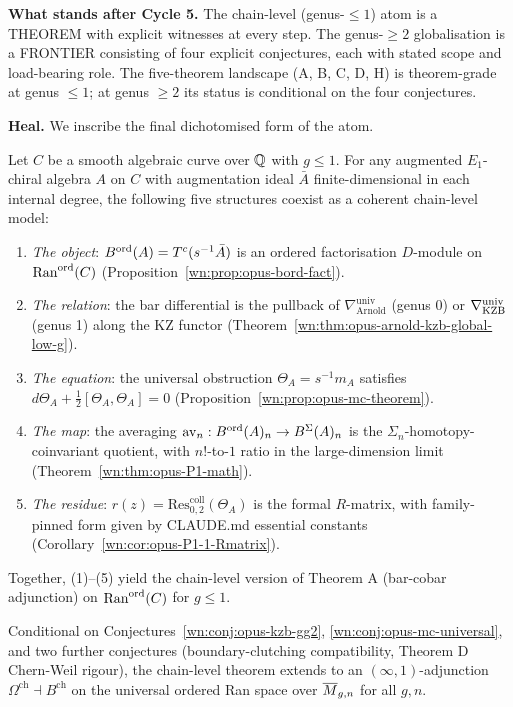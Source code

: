 \textbf{What stands after Cycle 5.} The chain-level (genus-$\le 1$)
atom is a THEOREM with explicit witnesses at every step. The genus-$\ge 2$
globalisation is a FRONTIER consisting of four explicit conjectures, each
with stated scope and load-bearing role. The five-theorem landscape
(A, B, C, D, H) is theorem-grade at genus $\le 1$; at genus $\ge 2$
its status is conditional on the four conjectures.

\textbf{Heal.} We inscribe the final dichotomised form of the atom.

\begin{theorem}
\label{wn:thm:opus-atom-chain}\ClaimStatusTheorem
Let $C$ be a smooth algebraic curve over $\mathbb{Q}$ with $g \le 1$. For any
augmented $E_1$-chiral algebra $A$ on $C$ with augmentation ideal
$\bar A$ finite-dimensional in each internal degree, the following
five structures coexist as a coherent chain-level model:
\begin{enumerate}
\item \emph{The object}: $B^{\mathrm{ord}}(A) = T^c(s^{-1} \bar A)$ is an ordered
factorisation $D$-module on $\mathrm{Ran}^{\mathrm{ord}}(C)$
(Proposition~\ref{wn:prop:opus-bord-fact}).
\item \emph{The relation}: the bar differential is the pullback of
$\nabla_{\mathrm{Arnold}}^{\mathrm{univ}}$ (genus 0) or
$\nabla_{\mathrm{KZB}}^{\mathrm{univ}}$ (genus 1) along the KZ
functor (Theorem~\ref{wn:thm:opus-arnold-kzb-global-low-g}).
\item \emph{The equation}: the universal obstruction $\Theta_A =
s^{-1} m_A$ satisfies $d \Theta_A + \tfrac{1}{2} [\Theta_A, \Theta_A] =
0$ (Proposition~\ref{wn:prop:opus-mc-theorem}).
\item \emph{The map}: the averaging $\mathrm{av}_n: B^{\mathrm{ord}}(A)_n \to B^{\Sigma}(A)_n$
is the $\Sigma_n$-homotopy-coinvariant quotient, with $n!$-to-$1$ ratio
in the large-dimension limit (Theorem~\ref{wn:thm:opus-P1-math}).
\item \emph{The residue}: $r(z) = \mathrm{Res}^{\mathrm{coll}}_{0,2}
(\Theta_A)$ is the formal $R$-matrix, with family-pinned form given by
CLAUDE.md essential constants (Corollary~\ref{wn:cor:opus-P1-1-Rmatrix}).
\end{enumerate}
Together, (1)--(5) yield the chain-level version of Theorem A
(bar-cobar adjunction) on $\mathrm{Ran}^{\mathrm{ord}}(C)$ for $g \le 1$.
\end{theorem}

\begin{corollary}
\label{wn:cor:opus-atom-inf1}\ClaimStatusConjectured
Conditional on Conjectures~\ref{wn:conj:opus-kzb-gg2},
\ref{wn:conj:opus-mc-universal}, and two further conjectures
(boundary-clutching compatibility, Theorem D Chern-Weil rigour), the
chain-level theorem extends to an $(\infty,1)$-adjunction
$\Omega^{\mathrm{ch}} \dashv B^{\mathrm{ch}}$ on the universal ordered
Ran space over $\overline{M}_{g,n}$ for all $g, n$.
\end{corollary}

